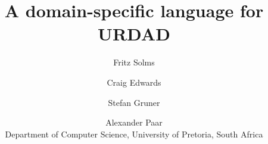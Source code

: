 \documentclass[11pt]{article}
\begin{document}
\title{A domain-specific language for URDAD}
\author{Fritz Solms \and Craig Edwards \and Stefan Gruner \and Alexander Paar
\\ Department of Computer Science, University of Pretoria, South Africa}

\maketitle





















 

\end{document}
